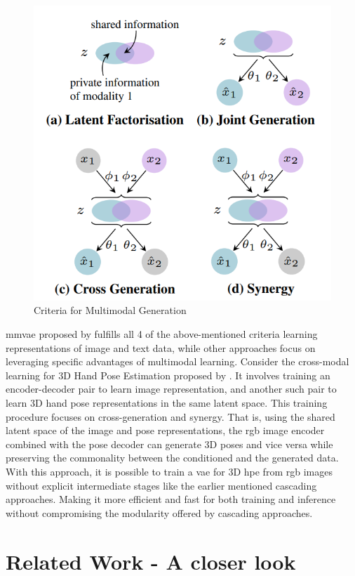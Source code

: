 \begin{figure}[!h]
    \centering
    \includegraphics[scale=0.4]{figures/criteria.png}
    \caption{Criteria for Multimodal Generation \cite{MMVAE}}
    \label{fig:criteria}
\end{figure}

\ac{mmvae} proposed by \cite{MMVAE} fulfills all 4 of the above-mentioned criteria learning representations of image and text data, while other approaches focus on leveraging specific advantages of multimodal learning. Consider the cross-modal learning for 3D Hand Pose Estimation proposed by \cite{crossmodal}. It involves training an encoder-decoder pair to learn image representation, and another such pair to learn 3D hand pose representations in the same latent space. This training procedure focuses on cross-generation and synergy. That is, using the shared latent space of the image and pose representations, the \ac{rgb} image encoder combined with the pose decoder can generate 3D poses and vice versa while preserving the commonality between the conditioned and the generated data. With this approach, it is possible to train a \ac{vae} for 3D \ac{hpe} from \ac{rgb} images without explicit intermediate stages like the earlier mentioned cascading approaches. Making it more efficient and fast for both training and inference without compromising the modularity offered by cascading approaches.

\section{Related Work - A closer look}
\label{section:Related Work}
\lipsum[1-5] %
